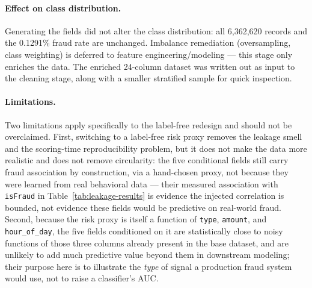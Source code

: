 \paragraph{Effect on class distribution.} Generating the fields did not alter the class distribution: all 6,362,620 records and the 0.1291\% fraud rate are unchanged. Imbalance remediation (oversampling, class weighting) is deferred to feature engineering/modeling --- this stage only enriches the data. The enriched 24-column dataset was written out as input to the cleaning stage, along with a smaller stratified sample for quick inspection.

\paragraph{Limitations.} Two limitations apply specifically to the label-free redesign and should not be overclaimed. First, switching to a label-free risk proxy removes the leakage smell and the scoring-time reproducibility problem, but it does not make the data more realistic and does not remove circularity: the five conditional fields still carry fraud association by construction, via a hand-chosen proxy, not because they were learned from real behavioral data --- their measured association with \texttt{isFraud} in Table~\ref{tab:leakage-results} is evidence the injected correlation is bounded, not evidence these fields would be predictive on real-world fraud. Second, because the risk proxy is itself a function of \texttt{type}, \texttt{amount}, and \texttt{hour\_of\_day}, the five fields conditioned on it are statistically close to noisy functions of those three columns already present in the base dataset, and are unlikely to add much predictive value beyond them in downstream modeling; their purpose here is to illustrate the \emph{type} of signal a production fraud system would use, not to raise a classifier's AUC.

